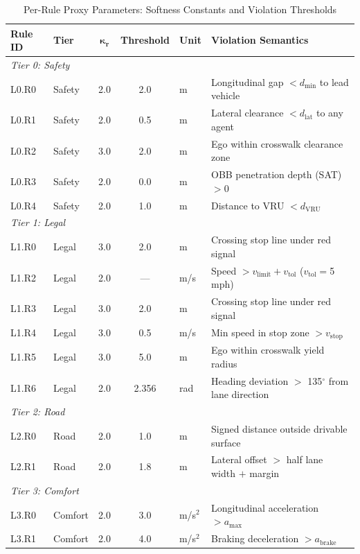 \begin{table}[t]
\centering
\caption{Per-Rule Proxy Parameters: Softness Constants and Violation Thresholds}
\label{tab:proxy_constants}
\small
\setlength{\tabcolsep}{4pt}
\begin{tabular}{llccll}
\toprule
\textbf{Rule ID} & \textbf{Tier} & $\boldsymbol{\kappa_r}$ & \textbf{Threshold} & \textbf{Unit} & \textbf{Violation Semantics} \\
\midrule
\multicolumn{6}{l}{\textit{Tier 0: Safety}} \\
L0.R0 & Safety & 2.0 & 2.0 & m & Longitudinal gap $< d_{\min}$ to lead vehicle \\
L0.R1 & Safety & 2.0 & 0.5 & m & Lateral clearance $< d_{\text{lat}}$ to any agent \\
L0.R2 & Safety & 3.0 & 2.0 & m & Ego within crosswalk clearance zone \\
L0.R3 & Safety & 2.0 & 0.0 & m & OBB penetration depth (SAT) $> 0$ \\
L0.R4 & Safety & 2.0 & 1.0 & m & Distance to VRU $< d_{\text{VRU}}$ \\
\midrule
\multicolumn{6}{l}{\textit{Tier 1: Legal}} \\
L1.R0 & Legal & 3.0 & 2.0 & m & Crossing stop line under red signal \\
L1.R2 & Legal & 2.0 & --- & m/s & Speed $> v_{\text{limit}} + v_{\text{tol}}$ ($v_{\text{tol}}{=}$5\,mph) \\
L1.R3 & Legal & 3.0 & 2.0 & m & Crossing stop line under red signal \\
L1.R4 & Legal & 3.0 & 0.5 & m/s & Min speed in stop zone $> v_{\text{stop}}$ \\
L1.R5 & Legal & 3.0 & 5.0 & m & Ego within crosswalk yield radius \\
L1.R6 & Legal & 2.0 & 2.356 & rad & Heading deviation $>$ 135$^\circ$ from lane direction \\
\midrule
\multicolumn{6}{l}{\textit{Tier 2: Road}} \\
L2.R0 & Road & 2.0 & 1.0 & m & Signed distance outside drivable surface \\
L2.R1 & Road & 2.0 & 1.8 & m & Lateral offset $>$ half lane width $+$ margin \\
\midrule
\multicolumn{6}{l}{\textit{Tier 3: Comfort}} \\
L3.R0 & Comfort & 2.0 & 3.0 & m/s$^2$ & Longitudinal acceleration $> a_{\max}$ \\
L3.R1 & Comfort & 2.0 & 4.0 & m/s$^2$ & Braking deceleration $> a_{\text{brake}}$ \\

\end{tabular}
\end{table}
